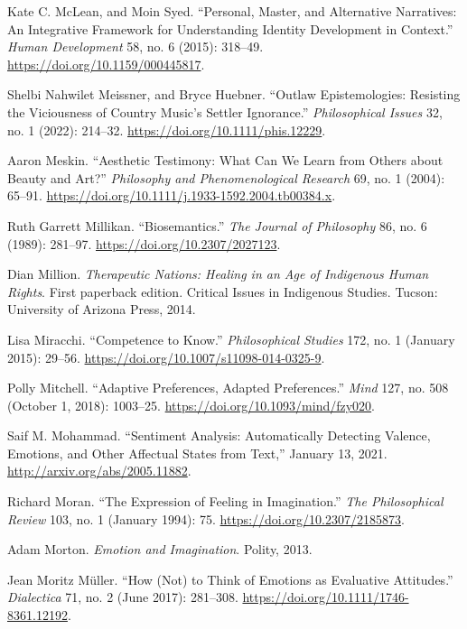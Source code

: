 \documentclass[phdthesis,12pt,final,a4paper]{wuthesis}
\newlength{\cslhangindent}
\newenvironment{CSLReferences}[2] %
{\begin{list}{}{%
	\setlength{\itemindent}{0pt}
	\setlength{\leftmargin}{0pt}
	\setlength{\parsep}{0pt}
	\ifodd #1
	\setlength{\leftmargin}{\cslhangindent}
	\setlength{\itemindent}{-1\cslhangindent}
	\fi
	\setlength{\itemsep}{#2\baselineskip}}}
{\end{list}}
\theoremstyle{definition}
\theoremstyle{definition}
\theoremstyle{definition}
\theoremstyle{definition}
\theoremstyle{remark}
\begin{document}
\begin{CSLReferences}{1}{0}
Kate C. McLean, and Moin Syed. {``Personal, {Master}, and {Alternative Narratives}: {An Integrative Framework} for {Understanding Identity Development} in {Context}.''} \emph{Human Development} 58, no. 6 (2015): 318--49. \url{https://doi.org/10.1159/000445817}.

Shelbi Nahwilet Meissner, and Bryce Huebner. {``Outlaw Epistemologies: {Resisting} the Viciousness of Country Music's Settler Ignorance.''} \emph{Philosophical Issues} 32, no. 1 (2022): 214--32. \url{https://doi.org/10.1111/phis.12229}.

Aaron Meskin. {``Aesthetic {Testimony}: {What Can We Learn} from {Others} about {Beauty} and {Art}?''} \emph{Philosophy and Phenomenological Research} 69, no. 1 (2004): 65--91. \url{https://doi.org/10.1111/j.1933-1592.2004.tb00384.x}.

Ruth Garrett Millikan. {``Biosemantics.''} \emph{The Journal of Philosophy} 86, no. 6 (1989): 281--97. \url{https://doi.org/10.2307/2027123}.

Dian Million. \emph{Therapeutic {Nations}: {Healing} in an {Age} of {Indigenous Human Rights}}. First paperback edition. Critical {Issues} in {Indigenous Studies}. Tucson: University of Arizona Press, 2014.

Lisa Miracchi. {``Competence to Know.''} \emph{Philosophical Studies} 172, no. 1 (January 2015): 29--56. \url{https://doi.org/10.1007/s11098-014-0325-9}.

Polly Mitchell. {``Adaptive {Preferences}, {Adapted Preferences}.''} \emph{Mind} 127, no. 508 (October 1, 2018): 1003--25. \url{https://doi.org/10.1093/mind/fzy020}.

Saif M. Mohammad. {``Sentiment {Analysis}: {Automatically Detecting Valence}, {Emotions}, and {Other Affectual States} from {Text},''} January 13, 2021. \url{http://arxiv.org/abs/2005.11882}.

Richard Moran. {``The {Expression} of {Feeling} in {Imagination}.''} \emph{The Philosophical Review} 103, no. 1 (January 1994): 75. \url{https://doi.org/10.2307/2185873}.

Adam Morton. \emph{Emotion and {Imagination}}. Polity, 2013.

Jean Moritz Müller. {``How ({Not}) to {Think} of {Emotions} as {Evaluative Attitudes}.''} \emph{Dialectica} 71, no. 2 (June 2017): 281--308. \url{https://doi.org/10.1111/1746-8361.12192}.


\end{CSLReferences}
\end{document}

